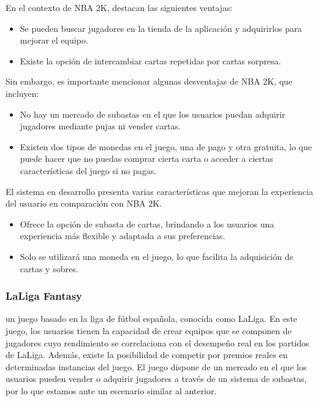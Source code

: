 En el contexto de NBA 2K, destacan las siguientes ventajas:
\begin{itemize}
    \item Se pueden buscar jugadores en la tienda de la aplicación y adquirirlos para mejorar el equipo.
    \item Existe la opción de intercambiar cartas repetidas por cartas sorpresa.
\end{itemize}

Sin embargo, es importante mencionar algunas desventajas de NBA 2K, que incluyen:
\begin{itemize}
    \item No hay un mercado de subastas en el que los usuarios puedan adquirir jugadores mediante pujas ni vender cartas.
    \item Existen dos tipos de monedas en el juego, una de pago y otra gratuita, lo que puede hacer que no puedas comprar cierta carta o acceder a ciertas características del juego si no pagas.
\end{itemize}

El sistema en desarrollo presenta varias características que mejoran la experiencia del usuario en comparación con NBA 2K.
\begin{itemize}
    \item Ofrece la opción de subasta de cartas, brindando a los usuarios una experiencia más flexible y adaptada a sus preferencias.
    \item Solo se utilizará una moneda en el juego, lo que facilita la adquisición de cartas y sobres.
\end{itemize}

\subsubsection{LaLiga Fantasy}
 un juego basado en la liga de fútbol española, conocida como LaLiga. En este juego, los usuarios tienen la capacidad de crear equipos que se componen de jugadores cuyo rendimiento se correlaciona con el desempeño real en los partidos de LaLiga. Además, existe la posibilidad de competir por premios reales en determinadas instancias del juego.
El juego dispone de un mercado en el que los usuarios pueden vender o adquirir jugadores a través de un sistema de subastas, por lo que estamos ante un escenario similar al anterior.

